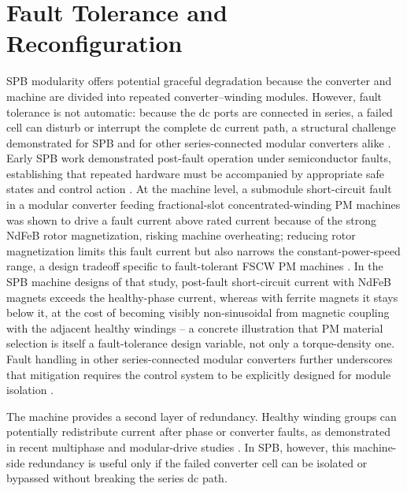 \section{Fault Tolerance and Reconfiguration}
\label{sec:fault_reconfiguration}

SPB modularity offers potential graceful degradation because the converter and
machine are divided into repeated converter--winding modules. However,
fault tolerance is not automatic: because the dc ports are connected
in series, a failed cell can disturb or interrupt the complete dc
current path, a structural challenge demonstrated for SPB and for
other series-connected modular converters alike
\cite{Nikouie2016Fault,Zhang2014FaultToleranceFSCW,Gjerde2014SeriesFault}.
Early SPB work demonstrated post-fault operation under semiconductor
faults, establishing that repeated hardware must
be accompanied by appropriate safe states and control action
\cite{Nikouie2016Fault}. At the
machine level, a submodule short-circuit fault in a modular converter
feeding fractional-slot concentrated-winding PM machines was shown to
drive a fault current above rated current because of the strong
NdFeB rotor magnetization, risking machine overheating; reducing rotor
magnetization limits this fault current but also narrows the
constant-power-speed range, a design tradeoff specific to
fault-tolerant FSCW PM machines \cite{Zhang2014FaultToleranceFSCW}.
In the SPB machine designs of that study, post-fault short-circuit
current with NdFeB magnets exceeds the healthy-phase current, whereas
with ferrite magnets it stays below it, at the cost of becoming
visibly non-sinusoidal from magnetic coupling with the adjacent
healthy windings -- a concrete illustration that PM material selection
is itself a fault-tolerance design variable, not only a torque-density
one. Fault handling in other series-connected modular converters
further underscores that mitigation requires the control system to be
explicitly designed for module isolation \cite{Gjerde2014SeriesFault}.

The machine provides a second layer of redundancy. Healthy winding
groups can potentially redistribute current after phase or converter
faults, as demonstrated in recent multiphase and modular-drive studies
\cite{Tang2025SixPhaseFault,Zhang2025FaultTolerantMMD,Du2026ModularPMSMFault}. In SPB, however, this machine-side redundancy
is useful only if the failed converter cell can be isolated or bypassed
without breaking the series dc path.

